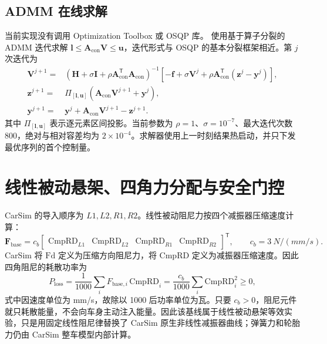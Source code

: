 \documentclass[UTF8,12pt,a4paper,fontset=windows]{ctexart}
\newcommand{\vect}[1]{\bm{#1}}
\newcommand{\trans}{^{\mathsf T}}
\begin{document}
\subsection{ADMM 在线求解}

当前实现没有调用 Optimization Toolbox 或 OSQP 库。 使用基于算子分裂的 ADMM 迭代求解
$\vect{l}\le\vect{A}_{\text{con}}\vect{V}\le\vect{u}$，迭代形式与 OSQP 的基本分裂框架相近。第 $j$ 次迭代为
\begin{align}
\vect{V}^{j+1}={}&
\left(\vect{H}+\sigma\vect{I}+\rho\vect{A}_{\text{con}}\trans\vect{A}_{\text{con}}\right)^{-1}
\left[-\vect{f}+\sigma\vect{V}^{j}
+\rho\vect{A}_{\text{con}}\trans(\vect{z}^{j}-\vect{y}^{j})\right],\\
\vect{z}^{j+1}={}&
\Pi_{[\vect{l},\vect{u}]}
\left(\vect{A}_{\text{con}}\vect{V}^{j+1}+\vect{y}^{j}\right),\\
\vect{y}^{j+1}={}&
\vect{y}^{j}+\vect{A}_{\text{con}}\vect{V}^{j+1}-\vect{z}^{j+1}.
\end{align}
其中 $\Pi_{[\vect{l},\vect{u}]}$ 表示逐元素区间投影。当前参数为
$\rho=1$、$\sigma=10^{-7}$、最大迭代次数 800，绝对与相对容差均为 $2\times10^{-4}$。求解器使用上一时刻结果热启动，并只下发最优序列的首个控制量。

\section{线性被动悬架、四角力分配与安全门控}

CarSim 的导入顺序为 $L1,L2,R1,R2$。线性被动阻尼力按四个减振器压缩速度计算：
\begin{equation}
\vect{F}_{\text{base}}=c_b
\begin{bmatrix}
\mathrm{CmpRD}_{L1}&\mathrm{CmpRD}_{L2}&\mathrm{CmpRD}_{R1}&\mathrm{CmpRD}_{R2}
\end{bmatrix}\trans,
\qquad c_b=\SI{3}{N/(mm/s)}.
\end{equation}
CarSim 将 $\mathrm{Fd}$ 定义为压缩方向阻尼力，将 $\mathrm{CmpRD}$ 定义为减振器压缩速度。因此四角阻尼的耗散功率为
\begin{equation}
P_{\text{loss}}
=\frac{1}{1000}\sum_i F_{\text{base},i}\,\mathrm{CmpRD}_i
=\frac{c_b}{1000}\sum_i \mathrm{CmpRD}_i^2\geq 0,
\end{equation}
式中因速度单位为 \si{mm/s}，故除以 1000 后功率单位为瓦。只要 $c_b>0$，阻尼元件就只耗散能量，不会向车身主动注入能量。因此该基线属于线性被动悬架等效实验，只是用固定线性阻尼律替换了 CarSim 原生非线性减振器曲线；弹簧力和轮胎力仍由 CarSim 整车模型内部计算。
\end{document}
